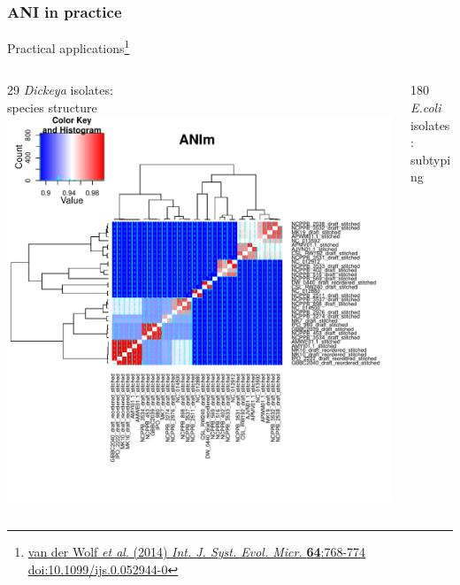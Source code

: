 \begin{frame}
  \frametitle{ANI in practice}
  Practical applications\footnote{\tiny{\href{http://dx.doi.org/10.1099/ijs.0.052944-0}{van der Wolf \textit{et al}. (2014) \textit{Int. J. Syst. Evol. Micr.} \textbf{64}:768-774 doi:10.1099/ijs.0.052944-0}}}\\[0.25cm]
  \begin{columns}[T]
    \begin{column}{5cm}
    29 \textit{Dickeya} isolates:\\
    species structure\\
      \includegraphics[width=1\textwidth]{images/ANIm_Dickeya}
    \end{column}
    \begin{column}{5cm}
    180 \textit{E.coli} isolates:\\
    subtyping

\end{column}
\end{columns}
\end{frame}
